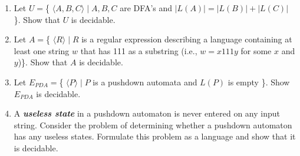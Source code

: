 \documentclass{article}
\begin{document}
\begin{enumerate}
        \item Let $U = $\{ $\langle A, B, C \rangle \mid A, B, C$ are DFA's and $|L(A)| = 
        |L(B)| + |L(C)|$ \}. Show that $U$ is decidable.

        \item Let $A = $\{ $\langle R \rangle \mid R$ is a regular expression describing a 
        language containing at least one string $w$ that has 111 as a substring (i.e., 
        $w = x111y$ for some $x$ and $y$)\}. Show that $A$ is decidable.
        
        \item Let $E_{PDA} = $\{ $\langle P \rangle \mid P$ is a pushdown automata and 
        $L(P)$ is empty \}. Show $E_{PDA}$ is decidable.

        \item A \textbf{\textit{useless state}} in a pushdown automaton is never entered 
        on any input string. Consider the problem of determining whether a pushdown 
        automaton has any useless states. Formulate this problem as a language and show 
        that it is decidable.
    \end{enumerate}
\end{document}
